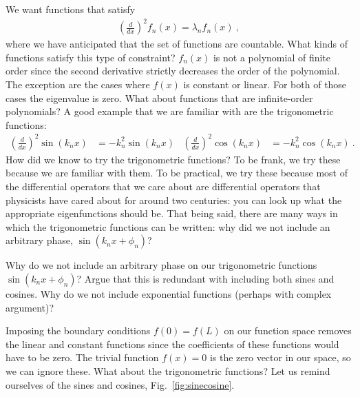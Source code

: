 We want functions that satisfy
\begin{align}
    \left(\frac{d}{dx}\right)^2f_n(x) = \lambda_n f_n(x) \ ,
\end{align}
where we have anticipated that the set of functions are countable. What kinds of functions satisfy this type of constraint? $f_n(x)$ is not a polynomial of finite order since the second derivative strictly decreases the order of the polynomial. The exception are the cases where $f(x)$ is constant or linear. For both of those cases the eigenvalue is zero. What about functions that are infinite-order polynomials? A good example that we are familiar with are the trigonometric functions:
\begin{align}
    \left(\frac{d}{dx}\right)^2\sin(k_nx) &=
    -k_n^2\sin(k_n x)
    &
    \left(\frac{d}{dx}\right)^2\cos(k_nx) &=
    -k_n^2\cos(k_n x) \ .
\end{align}
How did we know to try the trigonometric functions? To be frank, we try these because we are familiar with them. To be practical, we try these because most of the differential operators that we care about are differential operators that physicists have cared about for around two centuries: you can look up what the appropriate eigenfunctions should be. That being said, there are many ways in which the trigonometric functions can be written: why did we not include an arbitrary phase, $\sin(k_nx+\phi_n)$? 
\begin{exercise}
Why do we not include an arbitrary phase on our trigonometric functions $\sin(k_nx+\phi_n)$? Argue that this is redundant with including both sines and cosines. Why do we not include exponential functions (perhaps with complex argument)?
\end{exercise}
Imposing the boundary conditions $f(0)=f(L)$ on our function space removes the linear and constant functions since the coefficients of these functions would have to be zero. The trivial function $f(x)=0$ is the zero vector in our space, so we can ignore these. What about the trigonometric functions? Let us remind ourselves of the sines and cosines, Fig.~\ref{fig:sinecosine}. 
